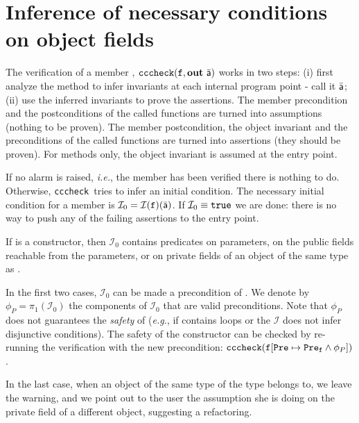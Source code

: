 \documentclass{llncs}
\newcommand{\Pre}[1]{\mathcal{I}(#1)}
\newcommand{\cccheck}{\texttt{cccheck}}
\newcommand{\verifyOne}[1]{\cccheck(#1)}
\newcommand{\verify}[2]{\cccheck(#1, \mathbf{out}\ #2)}
\begin{document}
\section{Inference of necessary conditions on object fields}

The verification of a member , $\verify{\code{f}}{\ael{a}}$ works in two steps: (i) first analyze the method to infer invariants at each internal program point - call it $\bar{\mathsf{\mathsf{a}}}$; (ii) use the inferred invariants to prove the assertions. 
The member precondition and the postconditions of the called functions are turned into assumptions (nothing to be proven).
The member postcondition, the object invariant and the preconditions of the called functions are turned into assertions (they should be proven).
For methods only, the object invariant is assumed at the entry point.

If no alarm is raised, \emph{i.e.}, the member has been verified there is nothing to do.
Otherwise, \cccheck\ tries to infer an initial condition.
The necessary initial condition for a member  is $\mathcal{I}_0 = \Pre{\code{f}}(\ael{a})$.
If $\mathcal{I}_0 \equiv \mathtt{true}$ we are done: there is no way to push any of the failing assertions to the entry point.

If  is a constructor, then $\mathcal{I}_0$ contains predicates on parameters, on the  public fields reachable from the parameters, or on private fields of an object of the same type as .

In the first two cases, $\mathcal{I}_0$ can be made a precondition of .
We denote by $\phi_P = \pi_1(\mathcal{I}_0)$ the components of $\mathcal{I}_0$ that are valid preconditions.
Note that $\phi_P$ does not guarantees the \emph{safety} of  (\emph{e.g.},  if  contains loops or the $\mathcal{I}$ does not infer disjunctive conditions).
The safety of the constructor can be checked by re-running the verification with the new precondition: $\verifyOne{\code{f}[\code{Pre} \mapsto \code{Pre}_\code{f} \wedge \phi_P]}$.

In the last case, when an object of the same type of the type  belongs to, we leave the warning, and we point out to the user the assumption she is doing on the private field of a different object, suggesting a refactoring.
\end{document}
